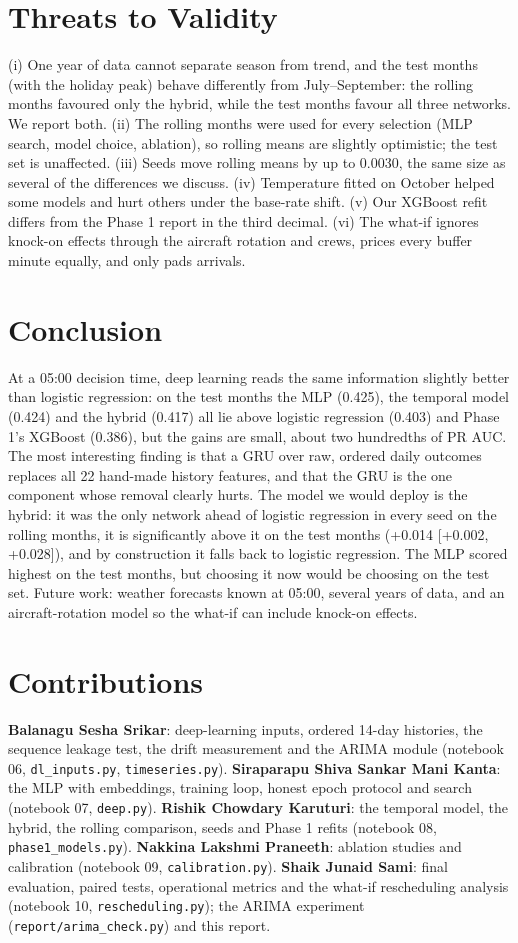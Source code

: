 \documentclass[conference]{IEEEtran}
\begin{document}
\section{Threats to Validity}
(i) One year of data cannot separate season from trend, and the test months (with the holiday peak) behave differently from July--September: the rolling months favoured only the hybrid, while the test months favour all three networks. We report both. (ii) The rolling months were used for every selection (MLP search, model choice, ablation), so rolling means are slightly optimistic; the test set is unaffected. (iii) Seeds move rolling means by up to 0.0030, the same size as several of the differences we discuss. (iv) Temperature fitted on October helped some models and hurt others under the base-rate shift. (v) Our XGBoost refit differs from the Phase 1 report in the third decimal. (vi) The what-if ignores knock-on effects through the aircraft rotation and crews, prices every buffer minute equally, and only pads arrivals.

\section{Conclusion}
At a 05:00 decision time, deep learning reads the same information slightly better than logistic regression: on the test months the MLP (0.425), the temporal model (0.424) and the hybrid (0.417) all lie above logistic regression (0.403) and Phase 1's XGBoost (0.386), but the gains are small, about two hundredths of PR AUC. The most interesting finding is that a GRU over raw, ordered daily outcomes replaces all 22 hand-made history features, and that the GRU is the one component whose removal clearly hurts. The model we would deploy is the hybrid: it was the only network ahead of logistic regression in every seed on the rolling months, it is significantly above it on the test months (+0.014 [+0.002, +0.028]), and by construction it falls back to logistic regression. The MLP scored highest on the test months, but choosing it now would be choosing on the test set. Future work: weather forecasts known at 05:00, several years of data, and an aircraft-rotation model so the what-if can include knock-on effects.

\section*{Contributions}
\textbf{Balanagu Sesha Srikar}: deep-learning inputs, ordered 14-day histories, the sequence leakage test, the drift measurement and the ARIMA module (notebook 06, \texttt{dl\_inputs.py}, \texttt{timeseries.py}). \textbf{Siraparapu Shiva Sankar Mani Kanta}: the MLP with embeddings, training loop, honest epoch protocol and search (notebook 07, \texttt{deep.py}). \textbf{Rishik Chowdary Karuturi}: the temporal model, the hybrid, the rolling comparison, seeds and Phase 1 refits (notebook 08, \texttt{phase1\_models.py}). \textbf{Nakkina Lakshmi Praneeth}: ablation studies and calibration (notebook 09, \texttt{calibration.py}). \textbf{Shaik Junaid Sami}: final evaluation, paired tests, operational metrics and the what-if rescheduling analysis (notebook 10, \texttt{rescheduling.py}); the ARIMA experiment (\texttt{report/arima\_check.py}) and this report.
\end{document}
